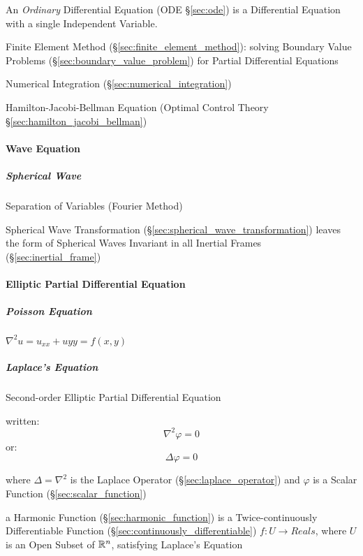\fist An \emph{Ordinary} Differential Equation (ODE \S\ref{sec:ode}) is a
Differential Equation with a single Independent Variable.

Finite Element Method (\S\ref{sec:finite_element_method}): solving
Boundary Value Problems (\S\ref{sec:boundary_value_problem}) for
Partial Differential Equations

\fist Numerical Integration (\S\ref{sec:numerical_integration})

\fist Hamilton-Jacobi-Bellman Equation (Optimal Control Theory
\S\ref{sec:hamilton_jacobi_bellman})



\paragraph{Wave Equation}\label{sec:dirichlet_problem}\hfill

\subparagraph{Spherical Wave}\label{sec:spherical_wave}\hfill

Separation of Variables (Fourier Method)

Spherical Wave Transformation (\S\ref{sec:spherical_wave_transformation})
leaves the form of Spherical Waves Invariant in all Inertial Frames
(\S\ref{sec:inertial_frame})



\paragraph{Elliptic Partial Differential Equation}
\label{sec:elliptic_partial_differential}\hfill

\subparagraph{Poisson Equation}\label{sec:poisson_equation}\hfill

$\nabla^2 u = u_{xx} + u{yy} = f(x,y)$



\subparagraph{Laplace's Equation}\label{sec:laplaces_equation}\hfill

Second-order Elliptic Partial Differential Equation

written:
\[ \nabla^2 \varphi = 0 \]
or:
\[ \Delta \varphi = 0 \]

where $\Delta = \nabla^2$ is the Laplace Operator
(\S\ref{sec:laplace_operator}) and $\varphi$ is a Scalar Function
(\S\ref{sec:scalar_function})

a Harmonic Function (\S\ref{sec:harmonic_function}) is a Twice-continuously
Differentiable Function (\S\ref{sec:continuously_differentiable}) $f : U
\rightarrow Reals$, where $U$ is an Open Subset of $\mathbb{R}^n$, satisfying
Laplace's Equation

